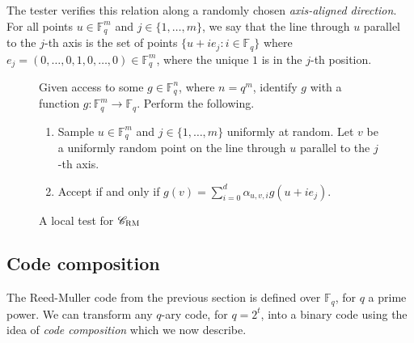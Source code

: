 \documentclass[11pt]{article}
\newtheorem{theorem}{Theorem}[section]
\theoremstyle{definition}
\newcommand{\code}{\mathscr{C}}
\newcommand{\F}{\ensuremath{\mathbb{F}}}
\newcommand{\mX}{\ensuremath{\mathcal{X}}}
\newcommand{\RM}{\ensuremath{\textsc{RM}}}
\DeclareMathOperator{\poly}{poly}
\newcommand{\eps}{\varepsilon}
\newenvironment{gamespec}{
  \begin{mdframed}[style=figstyle]}{
  \end{mdframed}}
\begin{document}
The tester verifies this relation along a randomly chosen \emph{axis-aligned direction}.  For all points $u \in \F_q^m$ and $j \in \{1,\ldots,m\}$, we say that the line through $u$ parallel to the $j$-th axis is the set of points $\{ u + ie_j : i \in \F_q \}$ where $e_j=(0,\ldots,0,1,0,\ldots,0)\in \F_q^m$, where the unique $1$ is in the $j$-th position. 


\begin{figure}[!htbp]
  \centering
  \begin{gamespec}
Given access to some $g\in \F_q^n$, where $n=q^m$, identify $g$ with a function $g:\F_q^m\to \F_q$. Perform the following.
\begin{enumerate}
	\item Sample	$u\in \F_q^m$ and $j\in \{1,\ldots,m\}$ uniformly at random. Let $v$ be a uniformly random point on the line through $u$ parallel to the $j$-th axis.
	\item 
	Accept if and only if $g(v) = \sum_{i=0}^{d} \alpha_{u,v,i} g(u+ie_j)$.  
    \end{enumerate}
  \end{gamespec}
  \caption{A local test for $\code_{\RM}$}
  \label{fig:RM-tester}
\end{figure}





\subsection{Code composition}
\label{sec:code-comp}

 The Reed-Muller code from the previous section is defined over $\F_q$, for $q$ a prime power. We can transform any $q$-ary code, for $q=2^t$, into a binary code using the idea of \emph{code composition} which we now describe. 
\end{document}
